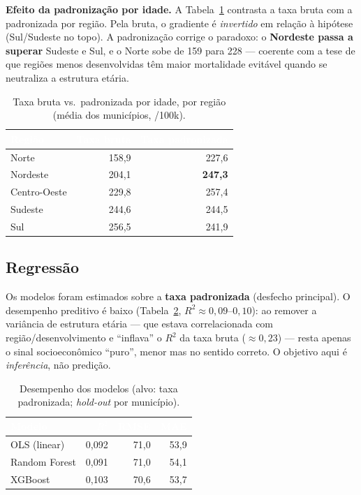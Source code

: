 \documentclass[11pt,a4paper]{article}
\newcommand{\hdr}[1]{\textcolor{white}{\textbf{#1}}}
\begin{document}
\textbf{Efeito da padronização por idade.} A Tabela~\ref{tab:gradiente} contrasta a taxa
bruta com a padronizada por região. Pela bruta, o gradiente é \emph{invertido} em relação à
hipótese (Sul/Sudeste no topo). A padronização corrige o paradoxo: o \textbf{Nordeste passa a
superar} Sudeste e Sul, e o Norte sobe de 159 para 228 --- coerente com a tese de que regiões
menos desenvolvidas têm maior mortalidade evitável quando se neutraliza a estrutura etária.

\begin{table}[htbp]
\centering\small
\caption{Taxa bruta vs.\ padronizada por idade, por região (média dos municípios, /100k).}
\label{tab:gradiente}
\begin{tabular}{l r r}
\rowcolor{cinzahdr}
\hdr{Região} & \hdr{Taxa bruta} & \hdr{Taxa padronizada} \\
\midrule
Norte        & 158,9 & 227,6 \\
Nordeste     & 204,1 & \textbf{247,3} \\
Centro-Oeste & 229,8 & 257,4 \\
Sudeste      & 244,6 & 244,5 \\
Sul          & 256,5 & 241,9 \\
\bottomrule
\end{tabular}
\end{table}

\subsection{Regressão}

Os modelos foram estimados sobre a \textbf{taxa padronizada} (desfecho principal). O
desempenho preditivo é baixo (Tabela~\ref{tab:metricas}, $R^2 \approx 0{,}09$--$0{,}10$):
ao remover a variância de estrutura etária --- que estava correlacionada com
região/desenvolvimento e ``inflava'' o $R^2$ da taxa bruta ($\approx 0{,}23$) --- resta apenas
o sinal socioeconômico ``puro'', menor mas no sentido correto. O objetivo aqui é
\emph{inferência}, não predição.

\begin{table}[htbp]
\centering\small
\caption{Desempenho dos modelos (alvo: taxa padronizada; \emph{hold-out} por município).}
\label{tab:metricas}
\begin{tabular}{l r r r}
\rowcolor{cinzahdr}
\hdr{Modelo} & \hdr{$R^2$} & \hdr{RMSE} & \hdr{MAE} \\
\midrule
OLS (linear)   & 0,092 & 71,0 & 53,9 \\
Random Forest  & 0,091 & 71,0 & 54,1 \\
XGBoost        & 0,103 & 70,6 & 53,7 \\
\bottomrule
\end{tabular}
\end{table}
\end{document}
